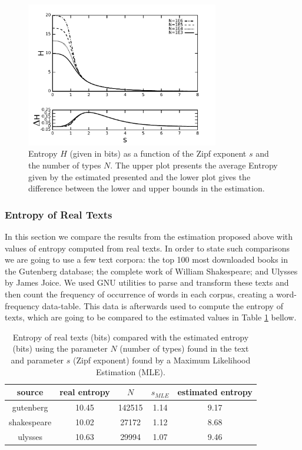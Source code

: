 \begin{figure}[htbp]
\centering
\includegraphics[width=0.75\textwidth]{images/entropy_N_s_limits_fulldh_pb.pdf}
\caption{Entropy $H$ (given in bits) as a function of the Zipf exponent $s$ and the number of types $N$. 
The upper plot presents the average Entropy given by the estimated presented and the lower plot gives
the difference between the lower and upper bounds in the estimation.}
\label{fig:entropy_N_s}
\end{figure}




\subsubsection{Entropy of Real Texts}
In this section we compare the results from the estimation proposed above with values
of entropy computed from real texts. In order to state such comparisons we are going 
to use a few text corpora: the top 100 most downloaded books in the Gutenberg database;
the complete work of William Shakespeare; and Ulysses by James Joice. 
We used GNU utilities to parse and transform these texts and then count the
frequency of occurrence of words in each corpus, creating a word-frequency
data-table. This data is afterwards used to compute the entropy of texts, which
are going to be compared to the estimated values in Table \ref{tab:entropytexts} bellow.

\begin{table}[h!]
\centering
\caption{Entropy of real texts (bits) compared with the estimated entropy (bits) using the parameter $N$ (number of types) found in the text and parameter $s$ (Zipf exponent) found by a Maximum Likelihood Estimation (MLE).}
\label{tab:entropytexts}
\begin{tabular}{| c | c | c | c | c |}
  \hline
  source & real entropy & $N$ & $s_{MLE}$ & estimated entropy \\
  \hline
  gutenberg     & 10.45 & 142515 & 1.14 & 9.17 \\
  shakespeare   & 10.02 & 27172  & 1.12 & 8.68 \\
  ulysses       & 10.63 & 29994  & 1.07 & 9.46 \\
  \hline
\end{tabular}
\end{table}

